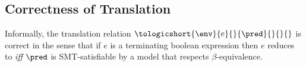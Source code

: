 
\subsection{Correctness of Translation}

Informally, the translation relation $\tologicshort{\env}{e}{}{\pred}{}{}{}$
is correct in the sense that if $e$ is a terminating boolean expression
then $e$ reduces to \etrue \textit{iff} $\pred$ is SMT-satisfiable
by a model that respects $\beta$-equivalence.

